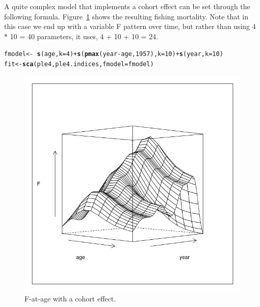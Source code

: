 \documentclass[a4paper,english,10pt]{article}\usepackage[]{graphicx}\usepackage[]{color}
\makeatletter
\def\maxwidth{ %
  \ifdim\Gin@nat@width>\linewidth
    \linewidth
  \else
    \Gin@nat@width
  \fi
}
\newcommand{\hlnum}[1]{\textcolor[rgb]{0.686,0.059,0.569}{#1}}%
\newcommand{\hlopt}[1]{\textcolor[rgb]{0,0,0}{#1}}%
\newcommand{\hlstd}[1]{\textcolor[rgb]{0.345,0.345,0.345}{#1}}%
\newcommand{\hlkwb}[1]{\textcolor[rgb]{0.69,0.353,0.396}{#1}}%
\newcommand{\hlkwc}[1]{\textcolor[rgb]{0.333,0.667,0.333}{#1}}%
\newcommand{\hlkwd}[1]{\textcolor[rgb]{0.737,0.353,0.396}{\textbf{#1}}}%
\newenvironment{kframe}{%
 \def\at@end@of@kframe{}%
 \ifinner\ifhmode%
  \def\at@end@of@kframe{\end{minipage}}%
  \begin{minipage}{\columnwidth}%
 \fi\fi%
 \def\FrameCommand##1{\hskip\@totalleftmargin \hskip-\fboxsep
 \colorbox{shadecolor}{##1}\hskip-\fboxsep
     \hskip-\linewidth \hskip-\@totalleftmargin \hskip\columnwidth}%
 \MakeFramed {\advance\hsize-\width
   \@totalleftmargin\z@ \linewidth\hsize
   \@setminipage}}%
 {\par\unskip\endMakeFramed%
 \at@end@of@kframe}
\newenvironment{knitrout}{}{} %
\makeatother
\begin{document}
A quite complex model that implements a cohort effect can be set through the following formula. Figure~\ref{fig:coh} shows the resulting fishing mortality. Note that in this case we end up with a variable F pattern over time, but rather than using 4 * 10 = 40 parameters, it uses, 4 + 10 + 10 = 24.

\begin{knitrout}
\color{fgcolor}\begin{kframe}
\begin{alltt}
\hlstd{fmodel} \hlkwb{<-} \hlopt{~}\hlkwd{s}\hlstd{(age,} \hlkwc{k} \hlstd{=} \hlnum{4}\hlstd{)} \hlopt{+} \hlkwd{s}\hlstd{(}\hlkwd{pmax}\hlstd{(year} \hlopt{-} \hlstd{age,} \hlnum{1957}\hlstd{),} \hlkwc{k} \hlstd{=} \hlnum{10}\hlstd{)} \hlopt{+} \hlkwd{s}\hlstd{(year,} \hlkwc{k} \hlstd{=} \hlnum{10}\hlstd{)}
\hlstd{fit} \hlkwb{<-} \hlkwd{sca}\hlstd{(ple4, ple4.indices,} \hlkwc{fmodel} \hlstd{= fmodel)}
\end{alltt}
\end{kframe}
\end{knitrout}

\begin{knitrout}
\color{fgcolor}\begin{figure}[H]

{\centering \includegraphics[width=\maxwidth]{figure/coh-1} 

}

\caption[F-at-age with a cohort effect]{F-at-age with a cohort effect.}\label{fig:coh}
\end{figure}


\end{knitrout}
\end{document}
